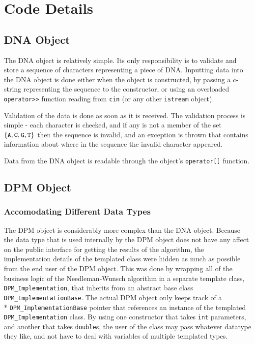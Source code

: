 \documentclass[a4paper]{report}
\begin{document}
\section*{Code Details}
\subsection*{DNA Object}

The DNA object is relatively simple. Its only responsibility is to validate
and store a sequence of characters representing a piece of DNA. Inputting
data into the DNA object is done either when the object is constructed, by
passing a c-string representing the sequence to the constructor, or
using an overloaded \verb=operator>>= function reading from \verb=cin= (or any other \verb=istream=
 object).

Validation of the data is done as soon as it is received. The validation
process is simple - each character is checked, and if any is not a member
of the set $\{\verb=A=,\verb=C=,\verb=G=,\verb=T=\}$ then the sequence is
invalid, and an exception is thrown that contains information about where in the
sequence the invalid character appeared.

Data from the DNA object is readable through the object's \verb=operator[]= function.

\subsection*{DPM Object}

\subsubsection*{Accomodating Different Data Types}

The DPM object is considerably more complex than the DNA object. Because the
data type that is used internally by the DPM object does not have any affect
on the public interface for getting the results of the algorithm, the
implementation details of the templated class were hidden as much as possible
from the end user of the DPM object. This was done by wrapping all of
the business logic of the Needleman-Wunsch algorithm in a separate template class,
\verb=DPM_Implementation=, that inherits from an abstract base class \verb=DPM_ImplementationBase=.
The actual DPM object only keeps track of a \\* \verb=DPM_ImplementationBase= pointer
that references an instance of the templated \verb=DPM_Implementation= class. By
using one constructor that takes \verb=int= parameters, and another that takes \verb=double=s,
the user of the class may pass whatever datatype they like, and not have to deal
with variables of multiple templated types.
\end{document}
